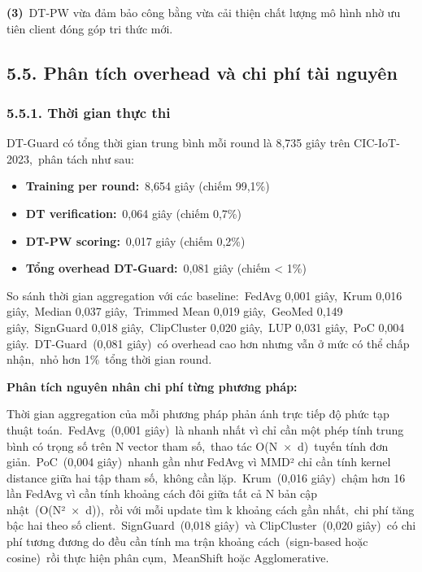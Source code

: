 \textbf{(3)}~DT-PW vừa đảm bảo công bằng vừa cải thiện chất lượng mô hình nhờ ưu tiên client đóng góp tri thức mới.

\subsection{5.5. Phân tích overhead và chi phí tài nguyên}\label{phuxe2n-tuxedch-overhead-vuxe0-chi-phuxed-tuxe0i-nguyuxean}

\subsubsection{5.5.1. Thời gian thực thi}\label{thux1eddi-gian-thux1ef1c-thi}

DT-Guard có tổng thời gian trung bình mỗi round là 8,735 giây trên CIC-IoT-2023,~phân tách như sau:

\begin{itemize}
\item
  \textbf{Training per round:}~8,654 giây (chiếm 99,1\%)
\item
  \textbf{DT verification:}~0,064 giây (chiếm 0,7\%)
\item
  \textbf{DT-PW scoring:}~0,017 giây (chiếm 0,2\%)
\item
  \textbf{Tổng overhead DT-Guard:}~0,081 giây (chiếm \textless{} 1\%)
\end{itemize}

So sánh thời gian aggregation với các baseline:~FedAvg 0,001 giây,~Krum 0,016 giây,~Median 0,037 giây,~Trimmed Mean 0,019 giây,~GeoMed 0,149 giây,~SignGuard 0,018 giây,~ClipCluster 0,020 giây,~LUP 0,031 giây,~PoC 0,004 giây.~DT-Guard~(0,081 giây)~có overhead cao hơn nhưng vẫn ở mức có thể chấp nhận,~nhỏ hơn 1\%~tổng thời gian round.

\textbf{Phân tích nguyên nhân chi phí từng phương pháp:}

Thời gian aggregation của mỗi phương pháp phản ánh trực tiếp độ phức tạp thuật toán.~FedAvg~(0,001 giây)~là nhanh nhất vì chỉ cần một phép tính trung bình có trọng số trên N vector tham số,~thao tác O(N~×~d)~tuyến tính đơn giản.~PoC~(0,004 giây)~nhanh gần như FedAvg vì MMD² chỉ cần tính kernel distance giữa hai tập tham số,~không cần lặp.~Krum~(0,016 giây)~chậm hơn 16 lần FedAvg vì cần tính khoảng cách đôi giữa tất cả N bản cập nhật~(O(N²~×~d)),~rồi với mỗi update tìm k khoảng cách gần nhất,~chi phí tăng bậc hai theo số client.~SignGuard~(0,018 giây)~và ClipCluster~(0,020 giây)~có chi phí tương đương do đều cần tính ma trận khoảng cách~(sign-based hoặc cosine)~rồi thực hiện phân cụm,~MeanShift hoặc Agglomerative.

